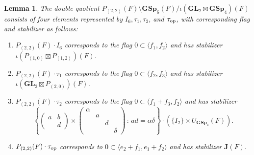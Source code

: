 \documentclass[11pt, reqno]{amsart}
\theoremstyle{plain}
\newtheorem{lemma}[theorem]{Lemma}
\theoremstyle{definition}
\theoremstyle{remark}
\theoremstyle{plain}
\def\GSp{{\mathbf{GSp}}}
\def\GL{\mathbf{GL}}
\begin{document}
\begin{lemma}\label{doublecosetPtilde}
    The double quotient $P_{(2,2)}(F)\setminus \GSp_6(F)/\iota\left(\GL_2\boxtimes\GSp_4\right)(F)$ consists of four elements represented by $I_6, \tau_1, \tau_2$, and $\tau_{\rm op}$, with corresponding flag and stabilizer as follows:
    \begin{enumerate}
        \item $P_{(2,2)}(F)\cdot I_6$ corresponds to the flag $0 \subset \langle f_1,f_2 \rangle $ and has stabilizer $\iota(P_{(1,0)}\boxtimes P_{(1,2)})(F)$.
        \item $P_{(2,2)}(F)\cdot \tau_1$ corresponds to the flag $0 \subset \langle f_2,f_3 \rangle $ and has stabilizer $\iota\left(\GL_2\boxtimes P_{(2,0)}\right)(F)$.
        \item $P_{(2,2)}(F)\cdot \tau_2$ corresponds to the flag $0 \subset \langle f_1+f_3,f_2 \rangle $ and has stabilizer 
        \[\left \{ \left(\begin{smallmatrix}a & b \\  & d\end{smallmatrix}\right) \times \left(\begin{smallmatrix}
      \alpha &  &&\\&a&&\\&&d & \\&&&\delta 
\end{smallmatrix}\right)\,:\, ad = \alpha \delta \right \} \cdot \left(\{ I_2\} \times U_{\GSp_4}(F)\right).\]
        \item $P_{(2,2)}(F) \cdot \tau_{\rm op}$ corresponds to $0 \subset \langle e_2+f_1, e_1+f_2 \rangle$ and has stabilizer $ \mathbf{J}(F).$
    \end{enumerate}
    
\end{lemma}
\end{document}
